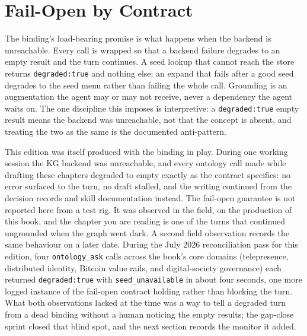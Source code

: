 \section{Fail-Open by Contract}

The binding's load-bearing promise is what happens when the backend is unreachable. Every
call is wrapped so that a backend failure degrades to an empty result and the turn
continues. A seed lookup that cannot reach the store returns \texttt{degraded:true} and
nothing else; an expand that fails after a good seed degrades to the seed menu rather than
failing the whole call. Grounding is an augmentation the agent may or may not receive,
never a dependency the agent waits on. The one discipline this imposes is interpretive: a
\texttt{degraded:true} empty result means the backend was unreachable, not that the concept
is absent, and treating the two as the same is the documented anti-pattern.

\begin{cautionbox}[title={Fail-open, observed on this book}]
This edition was itself produced with the binding in play. During one working session the
KG backend was unreachable, and every ontology call made while drafting these chapters
degraded to empty exactly as the contract specifies: no error surfaced to the turn, no
draft stalled, and the writing continued from the decision records and skill documentation
instead. The fail-open guarantee is not reported here from a test rig. It was observed in
the field, on the production of this book, and the chapter you are reading is one of the
turns that continued ungrounded when the graph went dark. A second field observation
records the same behaviour on a later date. During the July 2026 reconciliation pass for
this edition, four \texttt{ontology\_ask} calls across the book's core domains
(telepresence, distributed identity, Bitcoin value rails, and digital-society governance)
each returned \texttt{degraded:true} with \texttt{seed\_unavailable} in about four seconds,
one more logged instance of the fail-open contract holding rather than blocking the turn.
What both observations lacked at the time was a way to tell a degraded turn from a dead
binding without a human noticing the empty results; the gap-close sprint closed that blind
spot, and the next section records the monitor it added.
\end{cautionbox}


